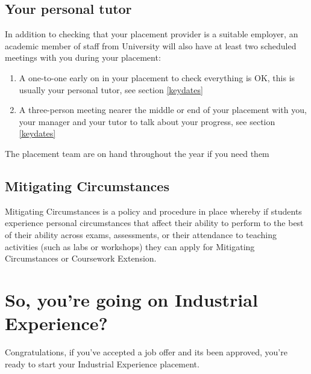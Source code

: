 \documentclass[
]{book}
\providecommand{\tightlist}{%
  \setlength{\itemsep}{0pt}\setlength{\parskip}{0pt}}
\begin{document}
\section{Your personal tutor}\label{tutor}

In addition to checking that your placement provider is a suitable employer, an academic member of staff from University will also have at least two scheduled meetings with you during your placement:

\begin{enumerate}
\def\labelenumi{\arabic{enumi}.}
\tightlist
\item
  A one-to-one early on in your placement to check everything is OK, this is usually your personal tutor, see section \ref{keydates}
\item
  A three-person meeting nearer the middle or end of your placement with you, your manager and your tutor to talk about your progress, see section \ref{keydates}
\end{enumerate}

The placement team are on hand throughout the year if you need them

\section{Mitigating Circumstances}\label{mitcircs}

Mitigating Circumstances is a policy and procedure in place whereby if students experience personal circumstances that affect their ability to perform to the best of their ability across exams, assessments, or their attendance to teaching activities (such as labs or workshops) they can apply for Mitigating Circumstances or Coursework Extension. \citep{mitcircs}

\chapter{So, you're going on Industrial Experience?}\label{starting}

Congratulations, if you've accepted a job offer and its been approved, you're ready to start your Industrial Experience placement.
\end{document}
